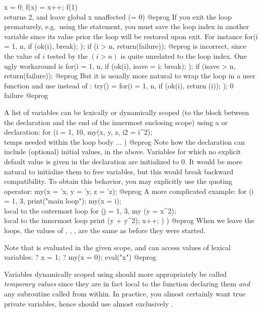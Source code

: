 x = 0;
f(x) = x++;
f(1)  \\ returns 2, and leave global x unaffected (= 0)
@eprog\noindent
If you exit the loop prematurely, e.g.~using the  statement, you
must save the loop index in another variable since its value prior the loop
will be restored upon exit. For instance
\bprog
  for(i = 1, n,
    if (ok(i), break);
  );
  if (i > n, return(failure));
@eprog\noindent
is incorrect, since the value of $i$ tested by the $(i > n)$ is quite
unrelated to the loop index. One ugly workaround is
\bprog
  for(i = 1, n,
    if (ok(i), isave = i; break);
  );
  if (isave > n, return(failure));
@eprog\noindent
But it is usually more natural to wrap the loop in a user function
and use  instead of :
\bprog
try() =
{
  for(i = 1, n,
    if (ok(i), return (i));
  );
  0 \\ failure
}
@eprog

A list of variables can be lexically or dynamically scoped (to the block
between the declaration and the end of the innermost enclosing scope) using a
 or  declaration:
\bprog
for (i = 1, 10,
  my(x, y, z, i2 = i^2); \\ temps needed within the loop body
  ...
)
@eprog\noindent
Note how the declaration can include (optional) initial values,  in the above. Variables for which no explicit default value is given
in the declaration are initialized to $0$. It would be more natural to
initialize them to free variables, but this would break backward
compatibility. To obtain this behavior, you may explicitly use the quoting
operator:
\bprog
my(x = 'x, y = 'y, z = 'z);
@eprog\noindent
A more complicated example:
\bprog
for (i = 1, 3,
  print("main loop");
  my(x = i);          \\ local to the outermost loop
  for (j = 1, 3,
    my (y = x^2);     \\ local to the innermost loop
    print (y + y^2);
    x++;
  )
)
@eprog\noindent
When we leave the loops, the values of , , , 
are the same as before they were started.

Note that  is evaluated in the given scope, and can access values
of lexical variables:
\bprog
? x = 1;
? my(x = 0); eval("x")
@eprog

Variables dynamically scoped using  should more appropriately be
called \emph{temporary values} since they are in fact local to the function
declaring them \emph{and} any subroutine called from within. In practice, you
almost certainly want true private variables, hence should use almost
exclusively .

